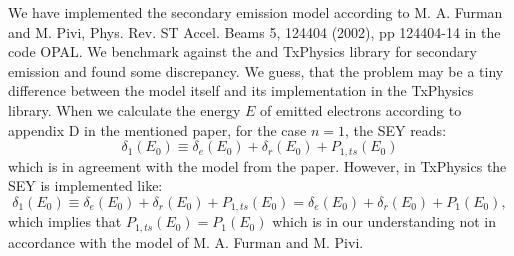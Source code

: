 \documentclass[a4paper,11pt]{article}
\begin{document}

We have implemented the secondary emission model according to M. A. Furman and M. Pivi, Phys. Rev. ST Accel. Beams 5, 124404 (2002), pp 124404-14 in the code OPAL. We benchmark against the  and TxPhysics library for secondary emission and found some discrepancy. We guess, that the problem may be a tiny difference between the model itself and its implementation in the TxPhysics library. When we calculate the energy $E$ of emitted electrons according to appendix D in the mentioned paper, for the case $n=1$, the SEY reads:
\begin{equation} 
\delta_1(E_0) \equiv \delta_e(E_0)+\delta_r(E_0)+P_{1,ts}(E_0) %
\end{equation}
 which is in agreement with the model from the paper. However, in TxPhysics the SEY is implemented like: 
 \begin{equation} 
 \delta_1(E_0) \equiv \delta_e(E_0)+\delta_r(E_0)+P_{1,ts}(E_0) = \delta_e(E_0)+\delta_r(E_0)+P_1(E_0), 
 \end{equation}
 which implies that $P_{1,ts}(E_0) = P_1(E_0)$ which is in our understanding not in accordance with the model of M. A. Furman and M. Pivi.\\
\end{document}
